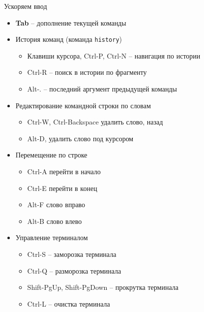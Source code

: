 \begin{frame}{Ускоряем ввод}
  \begin{itemize}
    \item \textbf{Tab} -- дополнение текущей команды
      \pause
    \item История команд (команда {\tt history})
      \begin{itemize}
        \item Клавиши курсора, Ctrl-P, Ctrl-N -- навигация по истории
        \item Ctrl-R -- поиск в истории по фрагменту
        \item Alt-.  -- последний аргумент предыдущей команды
      \end{itemize}
    \item Редактирование командной строки по словам
      \begin{itemize}
        \item Ctrl-W, Ctrl-Backspace удалить слово, назад
        \item Alt-D, удалить слово под курсором 
      \end{itemize}
    \item Перемещение по строке
      \begin{itemize}
        \item Ctrl-A перейти в начало 
        \item Ctrl-E перейти в конец
        \item Alt-F слово вправо
        \item Alt-B слово влево
      \end{itemize}
    \item Управление терминалом
      \begin{itemize}
        \item Ctrl-S -- заморозка терминала
        \item Ctrl-Q -- разморозка терминала
        \item Shift-PgUp, Shift-PgDown -- прокрутка терминала
        \item Ctrl-L -- очистка терминала
      \end{itemize}
  \end{itemize}
\end{frame}

